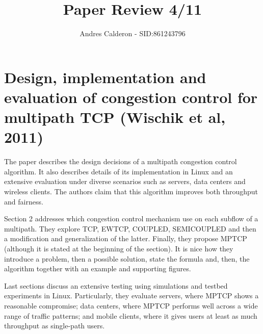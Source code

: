 \documentclass[a4paper,10pt]{scrartcl}
\title{Paper Review 4/11}
\author{Andres Calderon - SID:861243796}
\begin{document}
\maketitle
\thispagestyle{empty}

\section*{Design, implementation and evaluation of congestion control for multipath TCP (Wischik et al, 2011)}
The paper describes the design decisions of a multipath congestion control algorithm.  It also describes details of its implementation in Linux and an extensive evaluation under diverse scenarios such as servers, data centers and wireless clients.  The authors claim that this algorithm improves both throughput and fairness.

Section 2 addresses which congestion control mechanism use on each subflow of a multipath.  They explore TCP, EWTCP, COUPLED, SEMICOUPLED and then a modification and generalization of the latter.  Finally,  they propose MPTCP (although it is stated at the beginning of the section).  It is nice how they introduce a problem, then a possible solution, state the formula and, then, the algorithm together with an example and supporting figures.

Last sections discuss an extensive testing using simulations and testbed experiments in Linux.  Particularly, they evaluate servers, where MPTCP shows a reasonable compromise; data centers, where MPTCP performs well across a wide range of traffic patterns; and mobile clients, where it gives users at least as much throughput as single-path users. 

\end{document}
